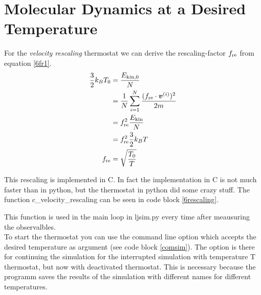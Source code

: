 \section{Molecular Dynamics at a Desired Temperature}

For the \emph{velocity rescaling} thermostat we can derive the rescaling-factor $f_\text{re}$ from equation \eqref{6fr1}.
\begin{align}
\frac{3}{2}k_BT_0
	&= \frac{E_{\text{kin},0}}{N}
	\label{6fr1}\\
&= \frac{1}{N}\sum_{i=1}^{N} \frac{(f_\text{re}\cdot\boldsymbol{v}^{(i)})^2}{2m}
	\label{6fr2}\\
&= f_\text{re}^2\frac{E_\text{kin}}{N}
	\label{6fr3}\\
&=f_\text{re}^2\frac{3}{2}k_BT
	\label{6fr4}\\
f_\text{re}
	&= \sqrt{\frac{T_0}{T}}
	\label{6r5}
\end{align}

This rescaling is implemented in C. In fact the implementation in C is not much faster than in python, but the thermostat in python did some crazy stuff.
The function c\_velocity\_rescaling can be seen in code block \ref{6rescaling}.


This function is used in the main loop in ljsim.py every time after meausuring the observalbles.\\

To start the thermostat you can use the command line option  which accepts the desired temperature as argument (see code block \ref{comsim}).
The option  is there for continuing the simulation for the interrupted simulation with temperature T thermostat, but now with deactivated thermostat.
This is necessary because the programm saves the results of the simulation with different names for different temperatures.